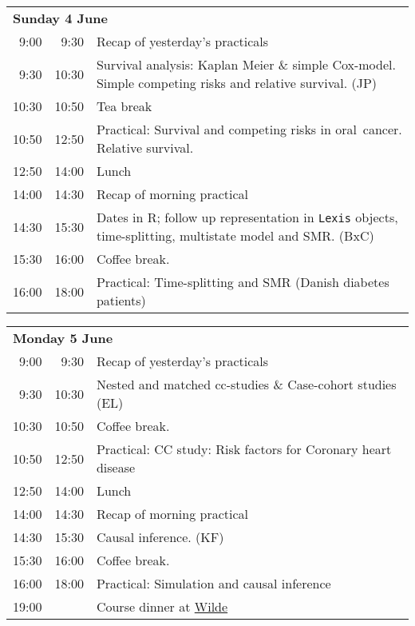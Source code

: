 \noindent
\begin{tabular}{r@{ -- }rp{13cm}}
\multicolumn{3}{l}{\bf Sunday 4 June} \\
 9:00 &  9:30 & Recap of yesterday's practicals \\
 9:30 & 10:30 & Survival analysis: Kaplan Meier \& simple
                Cox-model. Simple competing risks and relative
                survival. (JP)\\
10:30 & 10:50 & Tea break\\
10:50 & 12:50 & Practical: Survival and competing risks in oral\
                cancer. Relative survival.\\
12:50 & 14:00 & Lunch \\
14:00 & 14:30 & Recap of morning practical \\
14:30 & 15:30 & Dates in R; follow up representation in \texttt{Lexis} objects,
                time-splitting, multistate model and SMR. (BxC)\\
15:30 & 16:00 & Coffee break. \\
16:00 & 18:00 & Practical: Time-splitting and SMR (Danish diabetes patients)\\[1em]
\end{tabular}

\noindent
\begin{tabular}{r@{ -- }rp{13cm}}
 \multicolumn{3}{l}{\bf Monday 5 June} \\
 9:00 &  9:30 & Recap of yesterday's practicals \\
 9:30 & 10:30 & Nested and matched cc-studies \& Case-cohort studies (EL) \\
10:30 & 10:50 & Coffee break. \\
10:50 & 12:50 & Practical: CC study: Risk factors for Coronary heart disease\\
12:50 & 14:00 & Lunch \\
14:00 & 14:30 & Recap of morning practical \\
14:30 & 15:30 & Causal inference. (KF)\\
15:30 & 16:00 & Coffee break. \\
16:00 & 18:00 & Practical: Simulation and causal inference\\
19:00 &       & Course dinner at %
\href{https://www.google.com/maps/place/Vilde+lokaal+ja+kohvik,+catering/@58.3786583,26.7195608,17.25z/data=!4m5!3m4!1s0x46eb36e097301cdb:0x32b45e5712e44ff!8m2!3d58.3781843!4d26.7228678}{Wilde}\\[1em]
\end{tabular}

